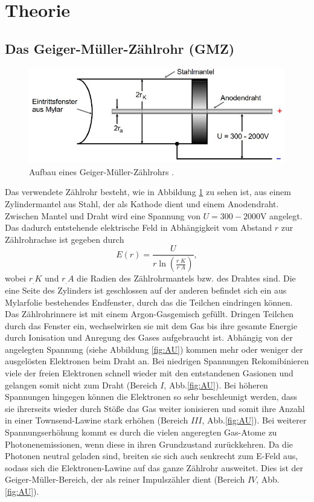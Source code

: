 \section{Theorie}
\label{sec:Theorie}

\subsection{Das Geiger-Müller-Zählrohr (GMZ)}

\begin{figure}
\centering
\includegraphics[scale=0.5]{content/images/aufbau1.jpg}
\caption{Aufbau eines Geiger-Müller-Zählrohrs \cite{V703}.}
\label{fig:GMZ}
\end{figure}
\noindent Das verwendete Zählrohr besteht, wie in Abbildung \ref{fig:GMZ} zu sehen ist, aus einem Zylindermantel aus Stahl, der als Kathode dient und einem Anodendraht. Zwischen Mantel und Draht wird eine Spannung von $U= 300 - 2000 \text{V}$ angelegt. Das dadurch entstehende elektrische Feld in Abhängigkeit vom Abstand $r$ zur Zählrohrachse ist gegeben durch
\[
E(r)=\frac{U}{r\ln\left(\frac{r_.K}{r_.A}\right)},
\]
wobei $r_.K$ und $r_.A$ die Radien des Zählrohrmantels bzw. des Drahtes sind.
Die eine Seite des Zylinders ist geschlossen auf der anderen befindet sich ein aus Mylarfolie bestehendes Endfenster, durch das die Teilchen eindringen können. Das Zählrohrinnere ist mit einem Argon-Gasgemisch gefüllt.
Dringen Teilchen durch das Fenster ein, wechselwirken sie mit dem Gas bis ihre gesamte Energie durch Ionisation und Anregung des Gases aufgebraucht ist.\newline
Abhängig von der angelegten Spannung (siehe Abbildung \ref{fig:AU})
kommen mehr oder weniger der ausgelösten Elektronen beim Draht an.
Bei niedrigen Spannungen Rekomibinieren viele der freien Elektronen schnell wieder mit den entstandenen Gasionen und gelangen somit nicht zum Draht (Bereich $I$, Abb.\ref{fig:AU}). Bei höheren Spannungen hingegen können die Elektronen so sehr beschleunigt werden, dass sie ihrerseits wieder durch Stöße das Gas weiter ionisieren und somit ihre Anzahl in einer Townsend-Lawine stark erhöhen \cite{V703} (Bereich $III$, Abb.\ref{fig:AU}).\newline
Bei weiterer Spannungserhöhung kommt es durch die vielen angeregten Gas-Atome zu Photonenemissionen, wenn diese in ihren Grundzustand zurückkehren. Da die Photonen neutral geladen sind, breiten sie sich auch senkrecht zum E-Feld aus, sodass sich die Elektronen-Lawine auf das ganze Zählrohr ausweitet. Dies ist der Geiger-Müller-Bereich, der als reiner Impulszähler dient (Bereich $IV$, Abb.\ref{fig:AU}).

